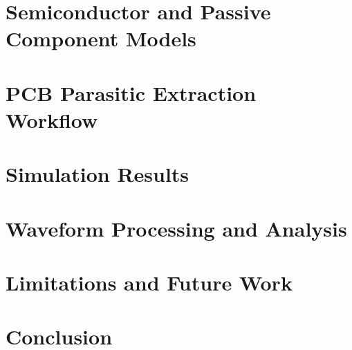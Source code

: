 \documentclass[11pt]{article}
\begin{document}
\section{Semiconductor and Passive Component Models}
\label{sec:models}


\section{PCB Parasitic Extraction Workflow}
\label{sec:parasitics}


\section{Simulation Results}
\label{sec:results}


\section{Waveform Processing and Analysis}
\label{sec:waveform_processing}


\section{Limitations and Future Work}
\label{sec:limitations}


\section{Conclusion}
\label{sec:conclusion}




\end{document}
